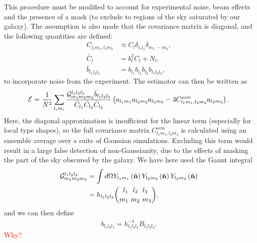     This procedure must be modified to account for experimental noise, beam effects and
    the presence of a mask (to exclude to regions of the sky saturated by our galaxy).
    The assumption is also made that the covariance matrix is diagonal, and the
    following quantities are defined:
    \begin{align}
        C_{l_1m_1,l_2m_2}&\approx C_l\delta_{l_1l_2}\delta_{m_1~-m_2},\label{diagonal_covariance}\\
           \tilde{C_l} &= b_l^2C_l+N_l,\\
           \bar{b}_{l_1l_2l_3} &= b_{l_1}b_{l_2}b_{l_3}b_{l_1l_2l_3},
    \end{align}
    to incorporate noise from the experiment.
    The estimator can then be written as~\cite{Fergusson_polyspectra, Fergusson_efficient}
    \begin{align}
        \mathcal{E} = \frac{1}{\bar{N}^2}\sum_{l_im_i}
        \frac{\mathcal{G}^{l_1l_2l_3}_{m_1m_2m_3}\bar{b}_{l_1l_2l_3}}{\tilde{C}_{l_1}\tilde{C}_{l_2}\tilde{C}_{l_3}}
        \left(a_{l_1m_1}a_{l_2m_2}a_{l_3m_3}-3C^{sim}_{l_1m_1,l_2m_2}a_{l_3m_3}\right).
    \end{align}
    Here, the diagonal approximation is insufficient for the linear term
    (especially for local type shapes), so the
    full covariance matrix $C^{sim}_{l_1m_1,l_2m_2}$ is calculated using an ensemble average
    over a suite of Gaussian simulations. Excluding this term would result in a large false
    detection of non-Gaussianity, due to the effects of masking the part of the sky obscured
    by the galaxy.
    We have here used the Gaunt integral
    \begin{align}
        \mathcal{G}^{l_1l_2l_3}_{m_1m_2m_3} &= \int d\Omega Y_{l_1m_1}\left(\hat{\mathbf{n}}\right) Y_{l_2m_2}\left(\hat{\mathbf{n}}\right) Y_{l_3m_3}\left(\hat{\mathbf{n}}\right) \\
        &= h_{l_1l_2l_3}{{l_1~~l_2~~l_3} \choose {m_1~m_2~m_3}},
    \end{align}
    and we can then define
    \begin{align}
        b_{l_1l_2l_3} = h^{-1}_{l_1l_2l_3}B_{l_1l_2l_3}.
    \end{align}
    \textcolor{red}{Why?}


